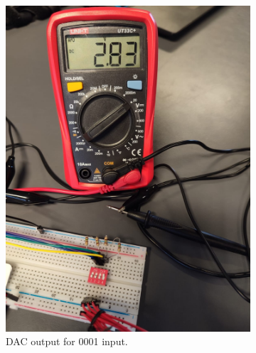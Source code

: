 \begin{figure}[H]
\begin{subfigure}[]{0.3\textwidth}
\includegraphics[width=\linewidth]{./Figures/DAC_Prac_0001.jpeg}
\caption{DAC output for 0001 input.} 			
\label{subfig:dac_prac_0001}	
\end{subfigure}
\hfill
\begin{subfigure}[]{0.3\textwidth}

\end{subfigure}
\end{figure}
